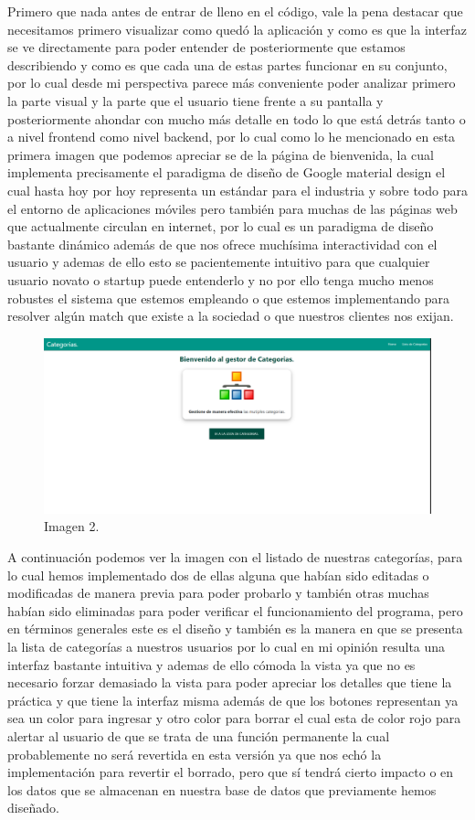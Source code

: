 \documentclass[10pt,a4paper]{article}
\begin{document}
Primero que nada antes de entrar de lleno en el código, vale la pena destacar que necesitamos primero visualizar como quedó la aplicación y como es que la interfaz se ve directamente para poder entender de posteriormente que estamos describiendo y como es que cada una de estas partes funcionar en su conjunto, por lo cual desde mi perspectiva parece más conveniente poder analizar primero la parte visual y la parte que el usuario tiene frente a su pantalla y posteriormente ahondar con mucho más detalle en todo lo que está detrás tanto o a nivel frontend como nivel backend, por lo cual como lo he mencionado en esta primera imagen que podemos apreciar se de la página de bienvenida, la cual implementa precisamente el paradigma de diseño de Google material design el cual hasta hoy por hoy representa un estándar para el industria y sobre todo para el entorno de aplicaciones móviles pero también para muchas de las páginas web que actualmente circulan en internet, por lo cual es un paradigma de diseño bastante dinámico además de que nos ofrece muchísima interactividad con el usuario y ademas de ello esto se pacientemente intuitivo para que cualquier usuario novato o startup puede entenderlo y no por ello tenga mucho menos robustes el sistema que estemos empleando o que estemos implementando para resolver algún match que existe a la sociedad o que nuestros clientes nos exijan.


\begin{figure}[h]
\centering
\includegraphics[width=12cm]{2}
\caption{Imagen 2.}
\label{fig:figure1}
\end{figure}
\vspace{60mm}

A continuación podemos ver la imagen con el listado de nuestras categorías, para lo cual hemos implementado dos de ellas alguna que habían sido editadas o modificadas de manera previa para poder probarlo y también otras muchas habían sido eliminadas para poder verificar el funcionamiento del programa, pero en términos generales este es el diseño y también es la manera en que se presenta la lista de categorías a nuestros usuarios por lo cual en mi opinión resulta una interfaz bastante intuitiva y ademas de ello cómoda la vista ya que no es necesario forzar demasiado la vista para poder apreciar los detalles que tiene la práctica y que tiene la interfaz misma además de que los botones representan ya sea un color para ingresar y otro color para borrar el cual esta de color rojo para alertar al usuario de que se trata de una función permanente la cual probablemente no será revertida en esta versión ya que nos echó la implementación para revertir el borrado, pero que sí tendrá cierto impacto o en los datos que se almacenan en nuestra base de datos que previamente hemos diseñado.
\end{document}
